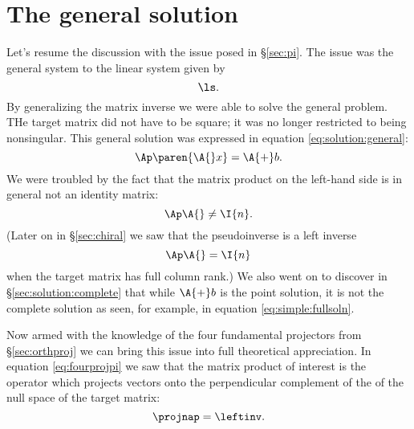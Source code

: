 \section{The general solution}

Let's resume the discussion with the issue posed in \S\eqref{sec:pi}. The issue was the general system to the linear system given by 
$$
\ls.
$$
By generalizing the matrix inverse we were able to solve the general problem. THe target matrix did not have to be square; it was no longer restricted to being nonsingular. This general solution was expressed in equation \eqref{eq:solution:general}:
$$
    \Ap\paren{\A{}x} = \A{+}b.
$$
We were troubled by the fact that the matrix product on the left-hand side is in general not an identity matrix:
\begin{equation}
  \Ap\A{} \ne \I{n}.
\end{equation}
(Later on in \S\eqref{sec:chiral} we saw that the pseudoinverse is a left inverse
\begin{equation}
  \Ap\A{} = \I{n}
\end{equation}
when the target matrix has full column rank.) We also went on to discover in \S\eqref{sec:solution:complete} that while $\A{+}b$ is the point solution, it is not the complete solution as seen, for example, in equation \eqref{eq:simple:fullsoln}.

Now armed with the knowledge of the four fundamental projectors from \S\eqref{sec:orthproj} we can bring this issue into full theoretical appreciation. In equation \eqref{eq:fourprojpi} we saw that the matrix product of interest is the operator which projects vectors onto the perpendicular complement of the of the null space of the target matrix:
\begin{equation}
  \projnap = \leftinv.
\end{equation}


\endinput